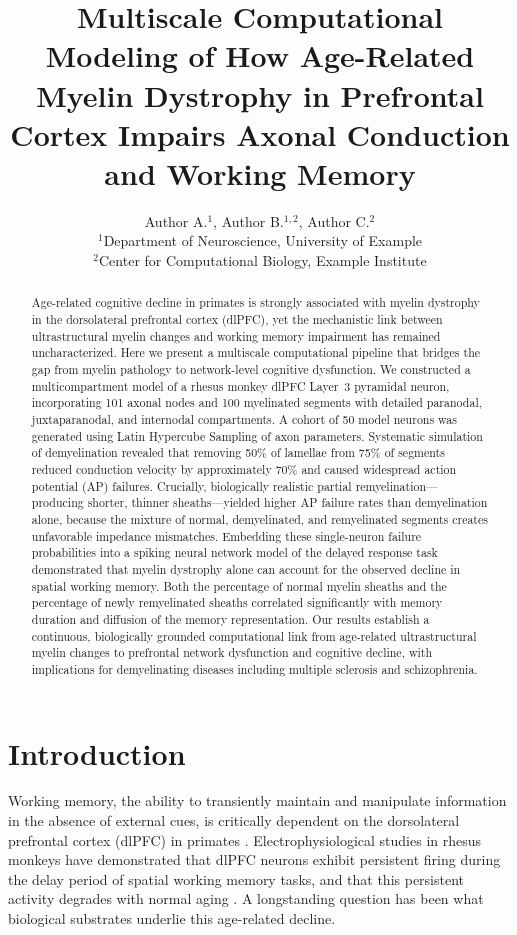 \documentclass[11pt]{article}
\title{Multiscale Computational Modeling of How Age-Related Myelin Dystrophy in Prefrontal Cortex Impairs Axonal Conduction and Working Memory}
\author{Author A.$^{1}$, Author B.$^{1,2}$, Author C.$^{2}$ \\
\small $^{1}$Department of Neuroscience, University of Example \\
\small $^{2}$Center for Computational Biology, Example Institute}
\date{}
\begin{document}
\maketitle

\begin{abstract}
Age-related cognitive decline in primates is strongly associated with myelin dystrophy in the dorsolateral prefrontal cortex (dlPFC), yet the mechanistic link between ultrastructural myelin changes and working memory impairment has remained uncharacterized. Here we present a multiscale computational pipeline that bridges the gap from myelin pathology to network-level cognitive dysfunction. We constructed a multicompartment model of a rhesus monkey dlPFC Layer~3 pyramidal neuron, incorporating 101 axonal nodes and 100 myelinated segments with detailed paranodal, juxtaparanodal, and internodal compartments. A cohort of 50 model neurons was generated using Latin Hypercube Sampling of axon parameters. Systematic simulation of demyelination revealed that removing 50\% of lamellae from 75\% of segments reduced conduction velocity by approximately 70\% and caused widespread action potential (AP) failures. Crucially, biologically realistic partial remyelination---producing shorter, thinner sheaths---yielded higher AP failure rates than demyelination alone, because the mixture of normal, demyelinated, and remyelinated segments creates unfavorable impedance mismatches. Embedding these single-neuron failure probabilities into a spiking neural network model of the delayed response task demonstrated that myelin dystrophy alone can account for the observed decline in spatial working memory. Both the percentage of normal myelin sheaths and the percentage of newly remyelinated sheaths correlated significantly with memory duration and diffusion of the memory representation. Our results establish a continuous, biologically grounded computational link from age-related ultrastructural myelin changes to prefrontal network dysfunction and cognitive decline, with implications for demyelinating diseases including multiple sclerosis and schizophrenia.
\end{abstract}

\section{Introduction}

Working memory, the ability to transiently maintain and manipulate information in the absence of external cues, is critically dependent on the dorsolateral prefrontal cortex (dlPFC) in primates \citep{goldman1995,funahashi1989}. Electrophysiological studies in rhesus monkeys have demonstrated that dlPFC neurons exhibit persistent firing during the delay period of spatial working memory tasks, and that this persistent activity degrades with normal aging \citep{wang2020}. A longstanding question has been what biological substrates underlie this age-related decline.
\end{document}
